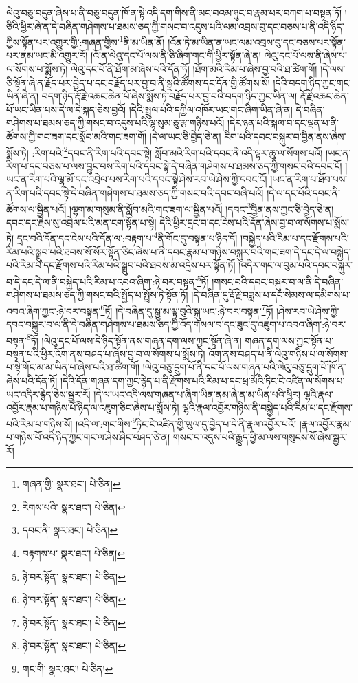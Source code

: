 ལེའུ་བཅུ་བདུན་ཞེས་པ་ནི་བཅུ་བདུན་ཁོ་ན་སྟེ་འདི་དག་གིས་ནི་མང་བའམ་ཉུང་བ་རྣམ་པར་བཀག་པ་བསྟན་ཏོ། །ཅིའི་ཕྱིར་ཞེ་ན་དེ་བཞིན་གཤེགས་པ་ཐམས་ཅད་ཀྱི་གསང་བ་འདུས་པའི་ལམ་འབྲས་བུ་དང་བཅས་པ་ནི་འདི་ཉིད་ཀྱིས་སྟོན་པར་འགྱུར་གྱི་:གཞན་གྱིས་\footnote{གཞན་གྱི་  སྣར་ཐང་།  པེ་ཅིན། }ནི་མ་ཡིན་ནོ། །འོན་ཏེ་མ་ཡིན་ན་ཡང་ལམ་འབྲས་བུ་དང་བཅས་པར་སྟོན་པར་ནམ་ཡང་མི་འགྱུར་རོ། །འོ་ན་ལེའུ་དང་པོ་ལས་ནི་ཅི་ཞིག་གང་གི་ཕྱིར་སྟོན་ཞེ་ན། ལེའུ་དང་པོ་ལས་ནི་ཞེས་པ་ལ་སོགས་པ་སྨོས་ཏེ། ལེའུ་དང་པོ་ནི་ཐོག་མ་ཞེས་པའི་དོན་ཏོ། །ཐོག་མའི་རིམ་པ་ཞེས་བྱ་བའི་ཐ་ཚིག་གོ། །དེ་ལས་ཅི་སྟོན་ཞེ་ན་རྗོད་པར་བྱེད་པ་དང་བརྗོད་པར་བྱ་བ་ནི་སྒྲའི་ཚོགས་དང་དོན་གྱི་ཚོགས་སོ། །དེའི་བདག་ཉིད་ཀྱང་གང་ཡིན་ཞེ་ན། བདག་ཉིད་རྡོ་རྗེ་འཆང་ཆེན་པོ་ཞེས་སྨོས་ཏེ་བརྗོད་པར་བྱ་བའི་བདག་ཉིད་ཀྱང་ཡིན་ལ། རྡོ་རྗེ་འཆང་ཆེན་པོ་ཡང་ཡིན་པས་དེ་ལ་དེ་སྐད་ཅེས་བྱའོ། །དེའི་སྤྲུལ་པའི་དཀྱིལ་འཁོར་ཡང་གང་ཞིག་ཡིན་ཞེ་ན། དེ་བཞིན་གཤེགས་པ་ཐམས་ཅད་ཀྱི་གསང་བ་འདུས་པའི་ལྷ་སུམ་ཅུ་རྩ་གཉིས་པའོ། །དེར་ཉན་པའི་སྐལ་བ་དང་ལྡན་པ་ནི་ཚོགས་ཀྱི་གང་ཟག་དང་སློབ་མའི་གང་ཟག་གོ། །དེ་ལ་ཡང་ཅི་བྱེད་ཅེ་ན། རིག་པའི་དབང་བསྐུར་བ་བྱིན་ནས་ཞེས་སྨོས་ཏེ། :རིག་པའི་\footnote{རིགས་པའི་  སྣར་ཐང་།  པེ་ཅིན། }དབང་ནི་རིག་པའི་དབང་སྟེ། སློབ་མའི་རིག་པའི་དབང་ནི་འདི་ལྟར་ཆུ་ལ་སོགས་པའོ། །ཡང་ན་རིག་པ་དང་བཅས་པ་ལས་བྱུང་བས་རིག་པའི་དབང་སྟེ་དེ་བཞིན་གཤེགས་པ་ཐམས་ཅད་ཀྱི་གསང་བའི་དབང་ངོ། །ཡང་ན་རིག་པའི་ལྷ་མོ་དང་འབྲེལ་པས་རིག་པའི་དབང་སྟེ་ཤེས་རབ་ཡེ་ཤེས་ཀྱི་དབང་ངོ། །ཡང་ན་རིག་པ་ཐོབ་པས་ན་རིག་པའི་དབང་སྟེ་དེ་བཞིན་གཤེགས་པ་ཐམས་ཅད་ཀྱི་གསང་བའི་དབང་བཞི་པའོ། །དེ་ལ་དང་པོའི་དབང་ནི་ཚོགས་ལ་སྦྱིན་པའོ། །ལྷག་མ་གསུམ་ནི་སློབ་མའི་གང་ཟག་ལ་སྦྱིན་པའོ། །དབང་\footnote{དབང་ནི་  སྣར་ཐང་།  པེ་ཅིན། }བྱིན་ནས་ཀྱང་ཅི་བྱེད་ཅེ་ན། དབང་དང་རྗེས་སུ་འབྲེལ་པའི་མན་ངག་སྟོན་པ་སྟེ། དེའི་ཕྱིར་དྲང་བ་དང་ངེས་པའི་དོན་ཞེས་བྱ་བ་ལ་སོགས་པ་སྨོས་ཏེ། དྲང་བའི་དོན་དང་ངེས་པའི་དོན་ལ་:བརྟག་པ་\footnote{བརྟགས་པ་  སྣར་ཐང་།  པེ་ཅིན། }ནི་གོང་དུ་བསྟན་པ་ཉིད་དོ། །བསྐྱེད་པའི་རིམ་པ་དང་རྫོགས་པའི་རིམ་པའི་སྒྲུབ་པའི་ཐབས་སོ་སོར་སྟོན་ཅིང་ཞེས་པ་ནི་དབང་རྣམ་པ་གཉིས་བསྐུར་བའི་གང་ཟག་དེ་དང་དེ་ལ་བསྐྱེད་པའི་རིམ་པ་དང་རྫོགས་པའི་རིམ་པའི་སྒྲུབ་པའི་ཐབས་མ་འདྲེས་པར་སྟོན་ཏོ། །འདིར་གང་ལ་བུམ་པའི་དབང་བསྐུར་བ་དེ་དང་དེ་ལ་ནི་བསྐྱེད་པའི་རིམ་པ་འབའ་ཞིག་:ཉེ་བར་བསྟན་\footnote{ཉེ་བར་སྟོན་  སྣར་ཐང་།  པེ་ཅིན། }ཏོ། །གསང་བའི་དབང་བསྐུར་བ་ལ་ནི་དེ་བཞིན་གཤེགས་པ་ཐམས་ཅད་ཀྱི་གསང་བའི་སྤྱོད་པ་སྤྲོས་ཏེ་སྟོན་ཏོ། །དེ་བཞིན་དུ་རྡོ་རྗེ་བཟླས་པ་དང་སེམས་ལ་དམིགས་པ་འབའ་ཞིག་ཀྱང་:ཉེ་བར་བསྟན་\footnote{ཉེ་བར་སྟོན་  སྣར་ཐང་།  པེ་ཅིན། }ཏོ། །དེ་བཞིན་དུ་སྒྱུ་མ་ལྟ་བུའི་སྐུ་ཡང་:ཉེ་བར་བསྟན་\footnote{ཉེ་བར་སྟོན་  སྣར་ཐང་།  པེ་ཅིན། }ཏོ། །ཤེས་རབ་ཡེ་ཤེས་ཀྱི་དབང་བསྐུར་བ་ལ་ནི་དེ་བཞིན་གཤེགས་པ་ཐམས་ཅད་ཀྱི་འོད་གསལ་བ་དང་ཟུང་དུ་འཇུག་པ་འབའ་ཞིག་:ཉེ་བར་བསྟན་\footnote{ཉེ་བར་སྟོན་  སྣར་ཐང་།  པེ་ཅིན། }ཏོ། །ལེའུ་དང་པོ་ལས་དེ་ཉིད་སྟོན་ནས་གཞན་དག་ལས་ཀྱང་སྟོན་ཞེ་ན། གཞན་དག་ལས་ཀྱང་སྟོན་པ་བསྟན་པའི་ཕྱིར་འོག་ནས་བཤད་པ་ཞེས་བྱ་བ་ལ་སོགས་པ་སྨོས་ཏེ། འོག་ནས་བཤད་པ་ནི་ལེའུ་གཉིས་པ་ལ་སོགས་པ་སྟེ་གོང་མ་མ་ཡིན་པ་ཞེས་པའི་ཐ་ཚིག་གོ། །ལེའུ་བཅུ་དྲུག་པོ་ནི་དང་པོ་ལས་གཞན་པའི་ལེའུ་བཅུ་དྲུག་པོ་ཁོ་ན་ཞེས་པའི་དོན་ཏོ། །དེའི་དོན་གཞན་དག་ཀྱང་རྙེད་པ་ནི་རྫོགས་པའི་རིམ་པ་དང་ཕྲ་མོའི་ཏིང་ངེ་འཛིན་ལ་སོགས་པ་ཡང་འདིར་རྙེད་ཅེས་སྦྱར་རོ། །དེ་ལ་ཡང་འདི་ལས་གཞན་པ་ཞིག་ཡིན་ནམ་ཞེ་ན་མ་ཡིན་པའི་ཕྱིར། ལྷའི་རྣལ་འབྱོར་རྣམ་པ་གཉིས་པོ་ཉིད་ལ་འཇུག་ཅིང་ཞེས་པ་སྨོས་ཏེ། ལྷའི་རྣལ་འབྱོར་གཉིས་ནི་བསྐྱེད་པའི་རིམ་པ་དང་རྫོགས་པའི་རིམ་པ་གཉིས་སོ། །འདི་ལ་:གང་གིས་\footnote{གང་གི་  སྣར་ཐང་།  པེ་ཅིན། }ཏིང་ངེ་འཛིན་གྱི་ཡུལ་དུ་བྱེད་པ་དེ་ནི་རྣལ་འབྱོར་པའོ། །རྣལ་འབྱོར་རྣམ་པ་གཉིས་པོ་འདི་ཉིད་ཀྱང་གང་ལ་ཤེས་ཤིང་བཤད་ཅེ་ན། གསང་བ་འདུས་པའི་རྒྱུད་ཕྱི་མ་ལས་གསུངས་སོ་ཞེས་སྦྱར་རོ། 
